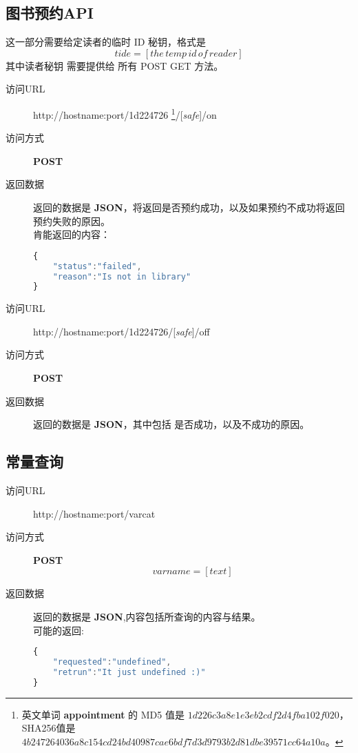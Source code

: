 \documentclass[UTF8]{article}
\def\safe{/[\textit{safe}]}
\def\POST{\colorbox[rgb]{0.77,0.53,0.97}{\textbf{POST}}}
\def\bfJSON{\textbf{JSON}}
\def\viaurl{\item[{\quad\colorbox[rgb]{0.47,0.88,0.89}{访问URL}}]}
\def\viareq#1{\item[{\quad\colorbox[rgb]{0.57,0.88,0.99}{访问方式}}] #1}
\def\rtdata{\item[{\quad\colorbox[rgb]{0.70,0.9,0.59}{返回数据}}]}
\begin{document}
        \subsection{图书预约API}
        这一部分需要给定读者的临时 ID 秘钥，格式是
        $$tide=[the\,temp\,id\,of\,reader]$$
        其中读者秘钥 需要提供给 所有 POST GET 方法。
        \begin{description}
	         \viaurl http://hostname:port/1d224726
	         \footnote{
	         	英文单词 \textbf{appointment} 的
	         	MD5 值是 $1d226c3a8e1e3eb2cdf2d4fba102f020$，
	         	SHA256值是 $4b247264036a8c154cd24bd40987cae6bdf7d3d9793b2d81dbe39571cc64a10a$。
	         }\safe/on
		     \viareq{\POST}
		     \rtdata 返回的数据是 \bfJSON ，将返回是否预约成功，以及如果预约不成功将返回预约失败的原因。
		     \\ 肯能返回的内容：
			 \begin{lstlisting}[language=JavaScript]
{
	"status":"failed",
	"reason":"Is not in library"
}
			 \end{lstlisting}
	       \end{description}
        \begin{description}
	        \viaurl http://hostname:port/1d224726\safe/off
	        \viareq{\POST}
	        \rtdata 返回的数据是 \bfJSON ，其中包括 是否成功，以及不成功的原因。
	         \end{description}
        \subsection{常量查询}
        \begin{description}
	        \viaurl http://hostname:port/varcat
	        \viareq{\POST}
	        $$varname=[text]$$
	        \rtdata 返回的数据是 \bfJSON ,内容包括所查询的内容与结果。
	        \\ 可能的返回:
			\begin{lstlisting}[language=JavaScript]
{
	"requested":"undefined",
	"retrun":"It just undefined :)"
}
			\end{lstlisting}
			 \end{description}
\end{document}
